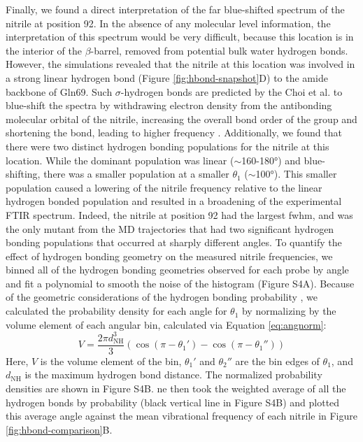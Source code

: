 Finally, we found a direct interpretation of the far blue-shifted spectrum of the nitrile at position 92.
In the absence of any molecular level information, the interpretation of this spectrum would be very difficult, because this location is in the interior of the $\beta$-barrel, removed from potential bulk water hydrogen bonds.
However, the simulations revealed that the nitrile at this location was involved in a strong linear hydrogen bond (Figure \ref{fig:hbond-snapshot}D) to the amide backbone of Gln69.
Such $\sigma$-hydrogen bonds are predicted by the Choi et al. to blue-shift the spectra by withdrawing electron density from the antibonding molecular orbital of the nitrile, increasing the overall bond order of the group and shortening the bond, leading to higher frequency \cite{Getahun2003, Adhikary2014, Eaton1988}.
Additionally, we found that there were two distinct hydrogen bonding populations for the nitrile at this location.
While the dominant population was linear ($\sim$160-\ang{180}) and blue-shifting, there was a smaller population at a smaller $\theta_1$ ($\sim$\ang{100}).
This smaller population caused a lowering of the nitrile frequency relative to the linear hydrogen bonded population and resulted in a broadening of the experimental FTIR spectrum.
Indeed, the nitrile at position 92 had the largest fwhm, and was the only mutant from the MD trajectories that had two significant hydrogen bonding populations that occurred at sharply different angles. 
To quantify the effect of hydrogen bonding geometry on the measured nitrile frequencies, we binned all of the hydrogen bonding geometries observed for each probe by angle and fit a polynomial to smooth the noise of the histogram (Figure S4A).
Because of the geometric considerations of the hydrogen bonding probability \cite{Kroon1975}, we calculated the probability density for each angle for $\theta_1$ by normalizing by the volume element of each angular bin, calculated via Equation \ref{eq:angnorm}: 
\begin{equation}
    V = \frac{2\pi d^3_{\text{NH}}}{3}(\cos(\pi-\theta_1') - \cos(\pi - \theta_1'')) 
    \label{eq:angnorm}
\end{equation}
Here, $V$ is the volume element of the bin, $\theta_1'$ and $\theta_2''$ are the bin edges of $\theta_1$, and $d_{\text{NH}}$ is the maximum hydrogen bond distance.
The normalized probability densities are shown in Figure S4B.
ne then took the weighted average of all the hydrogen bonds by probability (black vertical line in Figure S4B) and plotted this average angle against the mean vibrational frequency of each nitrile in Figure \ref{fig:hbond-comparison}B. 

